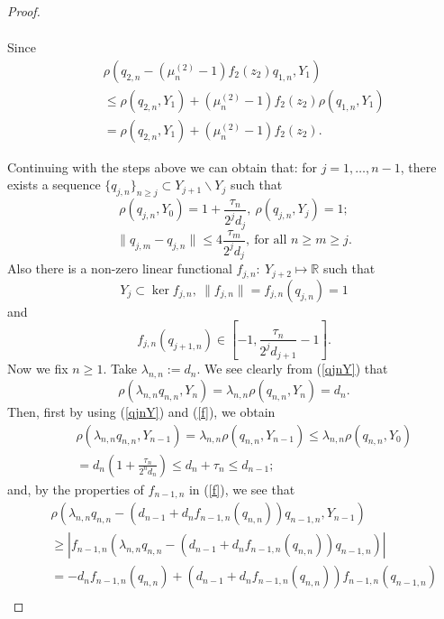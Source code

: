 \documentclass[10pt,a4paper]{amsart}
\begin{document}
\begin{proof}
\begin{itemize}
\begin{enumerate}
\begin{eqnarray*}
\end{eqnarray*}
Since
\begin{eqnarray*}
&&\rho\left(q_{2,n}-(\mu_n^{(2)}-1)f_2(z_2)q_{1,n},Y_1\right)
\\
&&\le \rho\left(q_{2,n},Y_1\right)+(\mu_n^{(2)}-1)f_2(z_2)\rho\left(q_{1,n},Y_1\right)\\
&&=\rho\left(q_{2,n},Y_1\right)+(\mu_n^{(2)}-1)f_2(z_2).
\end{eqnarray*}
\end{enumerate}
\end{itemize}
Continuing with  the steps above we can obtain that:
for $j=1,\ldots,n-1$, there exists a sequence $\{q_{j,n}\}_{n\ge j}\subset Y_{j+1}\backslash Y_j$ such that
\begin{equation}
\label{qjnY}
\rho(q_{j,n},Y_{0})=1+\frac{\tau_n}{2^jd_j},~\rho(q_{j,n},Y_j)=1;
\end{equation}
\begin{equation}
\label{diffq}
\|q_{j,m}-q_{j,n}\|\le 4\frac{\tau_m}{2^jd_j},~\mbox{for all $n\ge m\ge j$}.
\end{equation}
Also there is a non-zero linear functional $f_{j,n}:~Y_{j+2}\longmapsto\mathbb R$ such that
$$
Y_j\subset \ker f_{j,n},~\|f_{j,n}\|=f_{j,n}(q_{j,n})=1
$$
and
\begin{equation}
\label{f}
f_{j,n}(q_{j+1,n})\in\left[-1,\frac{\tau_n}{2^{j}d_{j+1}}-1\right].
\end{equation}
Now we fix $n\ge1$. Take $\lambda_{n,n}:=d_n$. We see clearly from (\ref{qjnY}) that
\begin{equation}
\label{identqn}
\rho(\lambda_{n,n}q_{n,n},Y_n)=\lambda_{n,n}\rho(q_{n,n},Y_n)=d_n.
\end{equation}
 Then, first by using (\ref{qjnY}) and (\ref{f}), we obtain
\begin{eqnarray}
\label{upperqn}
&&\rho(\lambda_{n,n}q_{n,n},Y_{n-1})=\lambda_{n,n}\rho(q_{n,n},Y_{n-1})\le \lambda_{n,n}\rho(q_{n,n},Y_0)\nonumber\\
&&=d_n\left(1+\frac{\tau_n}{2^nd_n}\right)\le  d_n+\tau_n\le d_{n-1};
\end{eqnarray}
and, by the properties of $f_{n-1,n}$ in (\ref{f}), we see that
\begin{eqnarray}
\label{lowerqn}
&&\rho(\lambda_{n,n}q_{n,n}-(d_{n-1}+d_nf_{n-1,n}(q_{n,n}))q_{n-1,n},Y_{n-1})\nonumber\\
&&\ge |f_{n-1,n}(\lambda_{n,n}q_{n,n}-(d_{n-1}+d_nf_{n-1,n}(q_{n,n}))q_{n-1,n})|\nonumber\\
&&= -d_nf_{n-1,n}(q_{n,n})+(d_{n-1}+d_nf_{n-1,n}(q_{n,n}))f_{n-1,n}(q_{n-1,n})\nonumber\\

\end{eqnarray}
\end{proof}
\end{document}
